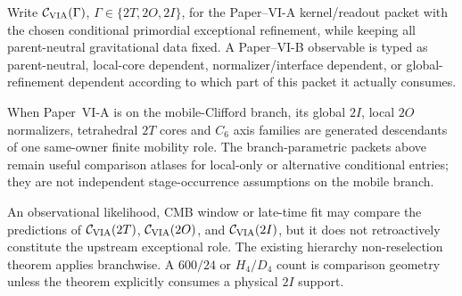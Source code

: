 \documentclass[12pt,a4paper]{article}
\begin{document}
\begin{definition}
\label{p9:def:v236-branch-parametric-packet}
Write \(\mathcal C_{\rm VIA}(\Gamma)\),
\(\Gamma\in\{2T,2O,2I\}\), for the Paper--VI-A kernel/readout packet with the
chosen conditional primordial exceptional refinement, while keeping all
parent-neutral gravitational data fixed.  A Paper--VI-B observable is typed as
parent-neutral, local-core dependent, normalizer/interface dependent, or
global-refinement dependent according to which part of this packet it
actually consumes.
\end{definition}

\begin{remark}
\label{p9:rem:v237-generated-exceptional-stage-packet}
When Paper~VI-A is on the mobile-Clifford branch, its global \(2I\), local
\(2O\) normalizers, tetrahedral \(2T\) cores and \(C_6\) axis families are
generated descendants of one same-owner finite mobility role.  The
branch-parametric packets above remain useful comparison atlases for
local-only or alternative conditional entries; they are not independent
stage-occurrence assumptions on the mobile branch.
\end{remark}

\begin{remark}
\label{p9:rem:v236-validation-not-reselection}
An observational likelihood, CMB window or late-time fit may compare the
predictions of \(\mathcal C_{\rm VIA}(2T)\),
\(\mathcal C_{\rm VIA}(2O)\), and \(\mathcal C_{\rm VIA}(2I)\), but it does
not retroactively constitute the upstream exceptional role.  The existing
hierarchy non-reselection theorem applies branchwise.  A \(600/24\) or
\(H_4/D_4\) count is comparison geometry unless the theorem explicitly
consumes a physical \(2I\) support.
\end{remark}
\end{document}

